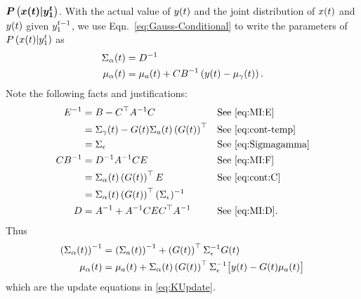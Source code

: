 \begin{enumerate}
{    $\bm{P\left({x}{(t)}|y_{1}^{t} \right)}$.}  With the
  actual value of ${y}{(t)}$ and the joint distribution of
  ${x}{(t)}$ and ${y}{(t)}$ given $y_{1}^{t-1}$, we use
  Eqn.~\eqref{eq:Gauss-Conditional} to write the parameters of
  $P\left({x}{(t)}|y_{1}^{t} \right)$ as
  \begin{subequations}
    \label{eq:UpdateRaw}
    \begin{align}
      {\Sigma_\alpha}{(t)} &= D^{-1} \\
      {\mu_\alpha}{(t)} &= {\mu_a}{(t)} + CB^{-1} \left(
        {y}{(t)} - {\mu_\gamma}{(t)}\right).
    \end{align}
  \end{subequations}
  Note the following facts and justifications:
  \begin{align*}
    E^{-1} &= B - C^\top A^{-1}C && \text{See \eqref{eq:MI:E}}\\
    &= {\Sigma_\gamma}{(t)} - {G}{(t)}{\Sigma_a}{(t)} \left(
    {G}{(t)}\right)^\top && \text{See \eqref{eq:cont-temp}}\\
    &= \Sigma_\epsilon && \text{See \eqref{eq:Sigmagamma}}\\
    CB^{-1} &= D^{-1}A^{-1}CE && \text{See \eqref{eq:MI:F}} \\
    &= {\Sigma_\alpha}{(t)} \left( {G}{(t)}
    \right)^\top E && \text{See \eqref{eq:cont:C}}\\
    &= {\Sigma_\alpha}{(t)} \left( {G}{(t)}
    \right)^\top (\Sigma_\epsilon)^{-1}\\
    D &= A^{-1} + A^{-1} CEC^\top A^{-1} && \text{See \eqref{eq:MI:D}}.
  \end{align*}
  Thus
    \begin{align*}
      \left( {\Sigma_\alpha}{(t)} \right)^{-1} &= \left(
        {\Sigma_a}{(t)} \right)^{-1} + \left( {G}{(t)}
        \right)^\top \Sigma_\epsilon^{-1} {G}{(t)} \\
      {\mu_\alpha}{(t)} &= {\mu_a}{(t)} +
      {\Sigma_{\alpha}}{(t)} \left( {G}{(t)} \right)^\top
      \Sigma_\epsilon^{-1} \big[{y}{(t)} - {G}{(t)}
      {\mu_a}{(t)}\big]
    \end{align*}
  which are the update equations in \eqref{eq:KUpdate}.
\end{enumerate}

